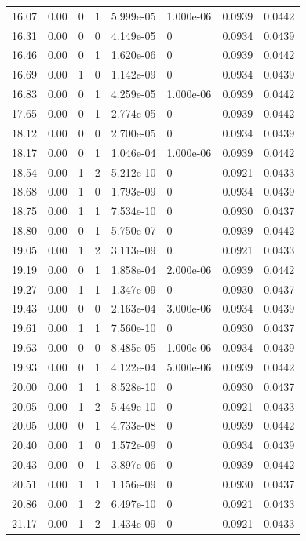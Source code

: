 \documentclass[preview]{standalone}
\begin{document}
{{{\begin{tabular}{L{1.2cm}C{1.2cm} C{0.3cm}C{0.5cm} C{1.4cm}C{1.4cm} C{1.4cm}C{1.4cm}}
  16.07  &  0.00  & 0     &  1 &  5.999e-05  & 1.000e-06  & 0.0939 &  0.0442   \\ 
  16.31  &  0.00  & 0     &  0 &  4.149e-05  & 0  & 0.0934 &  0.0439   \\ 
  16.46  &  0.00  & 0     &  1 &  1.620e-06  & 0  & 0.0939 &  0.0442   \\ 
  16.69  &  0.00  & 1     &  0 &  1.142e-09  & 0  & 0.0934 &  0.0439   \\ 
  16.83  &  0.00  & 0     &  1 &  4.259e-05  & 1.000e-06  & 0.0939 &  0.0442   \\ 
  17.65  &  0.00  & 0     &  1 &  2.774e-05  & 0  & 0.0939 &  0.0442   \\ 
  18.12  &  0.00  & 0     &  0 &  2.700e-05  & 0  & 0.0934 &  0.0439   \\ 
  18.17  &  0.00  & 0     &  1 &  1.046e-04  & 1.000e-06  & 0.0939 &  0.0442   \\ 
  18.54  &  0.00  & 1     &  2 &  5.212e-10  & 0  & 0.0921 &  0.0433   \\ 
  18.68  &  0.00  & 1     &  0 &  1.793e-09  & 0  & 0.0934 &  0.0439   \\ 
  18.75  &  0.00  & 1     &  1 &  7.534e-10  & 0  & 0.0930 &  0.0437   \\ 
  18.80  &  0.00  & 0     &  1 &  5.750e-07  & 0  & 0.0939 &  0.0442   \\ 
  19.05  &  0.00  & 1     &  2 &  3.113e-09  & 0  & 0.0921 &  0.0433   \\ 
  19.19  &  0.00  & 0     &  1 &  1.858e-04  & 2.000e-06  & 0.0939 &  0.0442   \\ 
  19.27  &  0.00  & 1     &  1 &  1.347e-09  & 0  & 0.0930 &  0.0437   \\ 
  19.43  &  0.00  & 0     &  0 &  2.163e-04  & 3.000e-06  & 0.0934 &  0.0439   \\ 
  19.61  &  0.00  & 1     &  1 &  7.560e-10  & 0  & 0.0930 &  0.0437   \\ 
  19.63  &  0.00  & 0     &  0 &  8.485e-05  & 1.000e-06  & 0.0934 &  0.0439   \\ 
  19.93  &  0.00  & 0     &  1 &  4.122e-04  & 5.000e-06  & 0.0939 &  0.0442   \\ 
  20.00  &  0.00  & 1     &  1 &  8.528e-10  & 0  & 0.0930 &  0.0437   \\ 
  20.05  &  0.00  & 1     &  2 &  5.449e-10  & 0  & 0.0921 &  0.0433   \\ 
  20.05  &  0.00  & 0     &  1 &  4.733e-08  & 0  & 0.0939 &  0.0442   \\ 
  20.40  &  0.00  & 1     &  0 &  1.572e-09  & 0  & 0.0934 &  0.0439   \\ 
  20.43  &  0.00  & 0     &  1 &  3.897e-06  & 0  & 0.0939 &  0.0442   \\ 
  20.51  &  0.00  & 1     &  1 &  1.156e-09  & 0  & 0.0930 &  0.0437   \\ 
  20.86  &  0.00  & 1     &  2 &  6.497e-10  & 0  & 0.0921 &  0.0433   \\ 
  21.17  &  0.00  & 1     &  2 &  1.434e-09  & 0  & 0.0921 &  0.0433   \\ 
\hline 
\end{tabular} 

}}}
\end{document}
